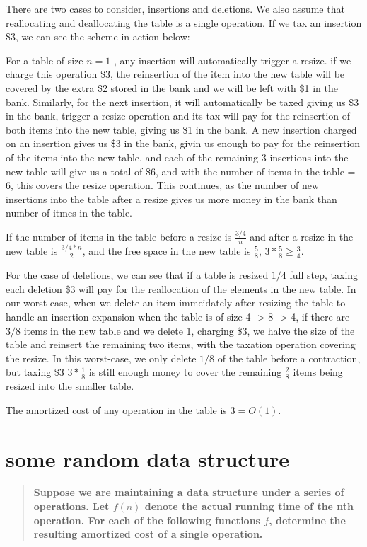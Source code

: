 \documentclass[titlepage]{article}\usepackage[]{graphicx}\usepackage[]{color}
\begin{document}
There are two cases to consider, insertions and deletions. We also assume that
reallocating and deallocating the table is a single operation. If we tax an
insertion \$3, we can see the scheme in action below:

For a table of size $n=1$ , any insertion will automatically trigger a resize.
if we charge this operation \$3, the reinsertion of the item into the new table
will be covered by the extra \$2 stored in the bank and we will be left with 
\$1 in the bank. Similarly, for the next insertion, it will automatically
be taxed giving us \$3 in the bank, trigger a resize operation and its tax will
pay for the reinsertion of both items into the new table, giving us \$1 in the
bank. A new insertion charged on an insertion gives us \$3 in the bank, givin
us enough to pay for the reinsertion of the items into the new table, and each
of the remaining 3 insertions into the new table will give us a total of \$6,
and with the number of items in the table = 6, this covers the resize
operation. This continues, as the number of new insertions into the table after
a resize gives us more money in the bank than number of itmes in the table. 

If the number of items in the table before a resize is $\frac{3/4}n$ and after a resize
in the new table is $\frac{3/4 *n}{2}$, and the free space in the new table is
$\frac{5}{8} $, $3 * \frac{5}{8} \geq \frac{3}{4}$. 

For the case of deletions, we can see that if a table is resized
$1/4$ full step, taxing each deletion \$3 will pay for the reallocation of the
elements in the new table. In our worst case, when we delete an item
immeidately after resizing the table to handle an insertion expansion when the
table is of size 4 -> 8 -> 4, if there are $3/8$ items in the new table and we
delete 1, charging \$3, we halve the size of the table and reinsert the
remaining two items, with the taxation operation covering the resize. In this
worst-case, we only delete $1/8$ of the table before a contraction, but taxing
\$3 $ 3* \frac{1}{8}$ is still enough money to cover the remaining
$\frac{2}{8}$ items being resized into the smaller table.

The amortized cost of any operation in the table is $3 = O(1)$.  


\section{some random data structure}
\begin{quote}
  \textbf{Suppose we are maintaining a data structure under a series of
  operations. Let $f(n)$ denote the actual running time of the nth operation.
For each of the following functions $f$, determine the resulting amortized cost
of a single operation.}
\end{quote}
\end{document}
